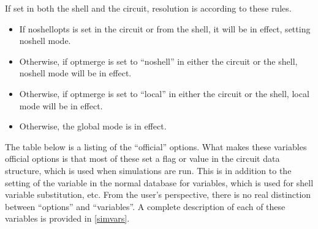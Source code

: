 If set in both the shell and the circuit, resolution is according
to these rules.

\begin{itemize}
\item{If {\vt noshellopts} is set in the circuit or from the
shell, it will be in effect, setting {\vt noshell} mode.}

\item{Otherwise, if {\vt optmerge} is set to ``{\vt noshell}'' in
either the circuit or the shell, {\vt noshell} mode will be in effect.}

\item{Otherwise, if {\vt optmerge} is set to ``{\vt local}'' in either
the circuit or the shell, {\vt local} mode will be in effect.}

\item{Otherwise, the {\vt global} mode is in effect.}
\end{itemize}

The table below is a listing of the ``official'' options.  What makes
these variables official options is that most of these set a flag or
value in the circuit data structure, which is used when simulations
are run.  This is in addition to the setting of the variable in the
normal database for variables, which is used for shell variable
substitution, etc.  From the user's perspective, there is no real
distinction between ``options'' and ``variables''.  A complete
description of each of these variables is provided in \ref{simvars}.

